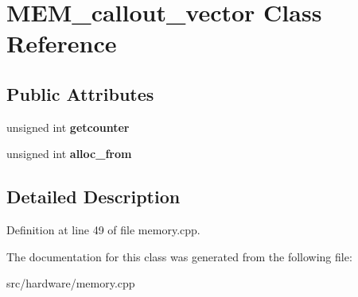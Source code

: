 \hypertarget{classMEM__callout__vector}{\section{M\-E\-M\-\_\-callout\-\_\-vector Class Reference}
\label{classMEM__callout__vector}
}
\subsection*{Public Attributes}
\begin{DoxyCompactItemize}
\item 
\hypertarget{classMEM__callout__vector_ae09b32d7854ef9163df3aa5cd4957956}{unsigned int {\bfseries getcounter}}\label{classMEM__callout__vector_ae09b32d7854ef9163df3aa5cd4957956}

\item 
\hypertarget{classMEM__callout__vector_a92ff2702b55bb31d7d9dc3f9e6ae4dc0}{unsigned int {\bfseries alloc\-\_\-from}}\label{classMEM__callout__vector_a92ff2702b55bb31d7d9dc3f9e6ae4dc0}

\end{DoxyCompactItemize}


\subsection{Detailed Description}


Definition at line 49 of file memory.\-cpp.



The documentation for this class was generated from the following file\-:\begin{DoxyCompactItemize}
\item 
src/hardware/memory.\-cpp\end{DoxyCompactItemize}
